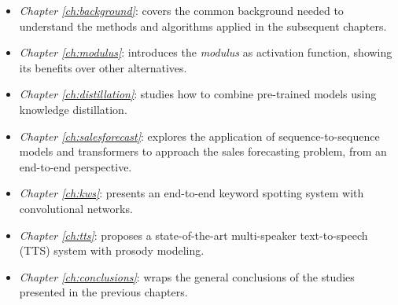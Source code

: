 \begin{itemize}
	\item \textit{Chapter \ref{ch:background}}: covers the common background needed to understand the methods and algorithms applied in the subsequent chapters.
	\item \textit{Chapter \ref{ch:modulus}}: introduces the \textit{modulus} as activation function, showing its benefits over other alternatives.
	\item \textit{Chapter \ref{ch:distillation}}: studies how to combine pre-trained models using knowledge distillation.
	\item \textit{Chapter \ref{ch:salesforecast}}: explores the application of sequence-to-sequence models and transformers to approach the sales forecasting problem, from an end-to-end perspective. 
	\item \textit{Chapter \ref{ch:kws}}: presents an end-to-end keyword spotting system with convolutional networks.
	\item \textit{Chapter \ref{ch:tts}}: proposes a state-of-the-art multi-speaker text-to-speech (TTS) system with prosody modeling.
	\item \textit{Chapter \ref{ch:conclusions}}: wraps the general conclusions of the studies presented in the previous chapters.
\end{itemize}


     


